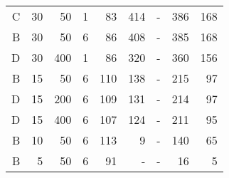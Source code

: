 \begin{table}[hbtp]
\begin{center}
\begin{tabular}{rrrrrrrrr}
            C              & 30             & 50             & 1           & 83                    & 414                   & -                     & 386                   & 168                  \\
            B              & 30             & 50             & 6           & 86                    & 408                   & -                     & 385                   & 168                  \\
            D              & 30             & 400            & 1           & 86                    & 320                   & -                     & 360                   & 156                  \\
            B              & 15             & 50             & 6           & 110                   & 138                   & -                     & 215                   & 97                   \\
            D              & 15             & 200            & 6           & 109                   & 131                   & -                     & 214                   & 97                   \\
            D              & 15             & 400            & 6           & 107                   & 124                   & -                     & 211                   & 95                   \\
            B              & 10             & 50             & 6           & 113                   & 9                     & -                     & 140                   & 65                   \\
            B              & 5              & 50             & 6           & 91                    & -                     & -                     & 16                    & 5                    \\
            \hline
        \end{tabular}
    \end{center}
\end{table}
